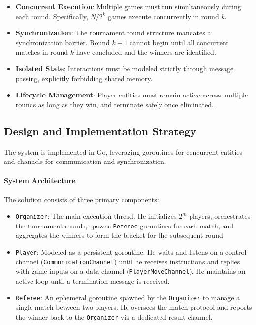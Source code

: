 \documentclass{scrartcl}
\begin{document}
\begin{itemize}
    \item \textbf{Concurrent Execution}: Multiple games must run simultaneously during each round. Specifically, $N/2^k$ games execute concurrently in round $k$.
    \item \textbf{Synchronization}: The tournament round structure mandates a synchronization barrier. Round $k+1$ cannot begin until all concurrent matches in round $k$ have concluded and the winners are identified.
    \item \textbf{Isolated State}: Interactions must be modeled strictly through message passing, explicitly forbidding shared memory.
    \item \textbf{Lifecycle Management}: Player entities must remain active across multiple rounds as long as they win, and terminate safely once eliminated.
\end{itemize}

\subsection{Design and Implementation Strategy}

The system is implemented in Go, leveraging goroutines for concurrent entities and channels for communication and synchronization. 

\paragraph{System Architecture}
The solution consists of three primary components:
\begin{itemize}
    \item \texttt{Organizer}: The main execution thread. He initializes $2^m$ players, orchestrates the tournament rounds, spawns \texttt{Referee} goroutines for each match, and aggregates the winners to form the bracket for the subsequent round.
    \item \texttt{Player}: Modeled as a persistent goroutine. He waits and listens on a control channel (\texttt{CommunicationChannel}) until he receives instructions and replies with game inputs on a data channel (\texttt{PlayerMoveChannel}). He maintains an active loop until a termination message is received.
    \item \texttt{Referee}: An ephemeral goroutine spawned by the \texttt{Organizer} to manage a single match between two players. He oversees the match protocol and reports the winner back to the \texttt{Organizer} via a dedicated result channel.
\end{itemize}
\end{document}
